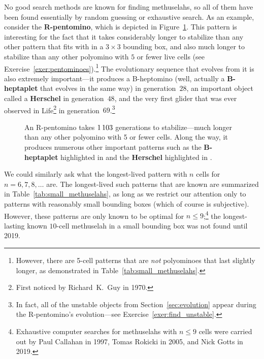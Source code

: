 No good search methods are known for finding methuselahs, so all of them have been found essentially by random guessing or exhaustive search. As an example, consider the \textbf{R-pentomino}, which is depicted in Figure~\ref{fig:r_pentomino}. This pattern is interesting for the fact that it takes considerably longer to stabilize than any other pattern that fits with in a $3 \times 3$ bounding box, and also much longer to stabilize than any other polyomino with $5$ or fewer live cells (see Exercise~\ref{exer:pentominoes}).\footnote{However, there are 5-cell patterns that are \emph{not} polyominoes that last slightly longer, as demonstrated in Table~\ref{tab:small_methuselahs}.} The evolutionary sequence that evolves from it is also extremely important---it produces a B-heptomino (well, actually a \textbf{B-heptaplet} that evolves in the same way) in generation~$28$, an important object called a \textbf{Herschel} in generation~$48$, and the very first glider that was ever observed in Life\footnote{First noticed by Richard~K.~Guy in 1970.} in generation~$69$.\footnote{In fact, all of the unstable objects from Section~\ref{sec:evolution} appear during the R-pentomino's evolution---see Exercise~\ref{exer:find_unstable}.}

\begin{figure}[!htb]
	\centering{}
	\caption{An R-pentomino takes $1{\,}103$ generations to stabilize---much longer than any other polyomino with 5 or fewer cells. Along the way, it produces numerous other important patterns such as the \textbf{B-heptaplet} highlighted in  and the \textbf{Herschel} highlighted in .}\label{fig:r_pentomino}
\end{figure}

We could similarly ask what the longest-lived pattern with $n$ cells for $n = 6, 7, 8, \ldots$ are. The longest-lived such patterns that are known are summarized in Table~\ref{tab:small_methuselahs}, as long as we restrict our attention only to patterns with reasonably small bounding boxes (which of course is subjective). However, these patterns are only known to be optimal for $n \leq 9$;\footnote{Exhaustive computer searches for methuselahs with $n \leq 9$ cells were carried out by Paul Callahan in 1997, Tomas Rokicki in 2005, and Nick Gotts in 2019.} the longest-lasting known $10$-cell methuselah in a small bounding box was not found until 2019.

